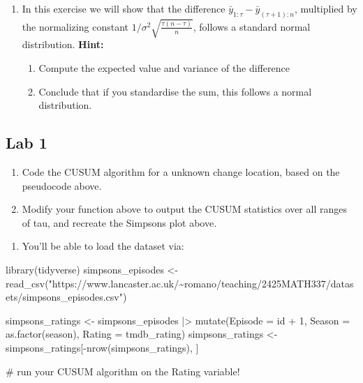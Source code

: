 \documentclass[
  letterpaper,
  DIV=11,
  numbers=noendperiod]{scrreprt}
\newenvironment{Shaded}{\begin{snugshade}}{\end{snugshade}}
\newcommand{\AttributeTok}[1]{\textcolor[rgb]{0.40,0.45,0.13}{#1}}
\newcommand{\CommentTok}[1]{\textcolor[rgb]{0.37,0.37,0.37}{#1}}
\newcommand{\DecValTok}[1]{\textcolor[rgb]{0.68,0.00,0.00}{#1}}
\newcommand{\FunctionTok}[1]{\textcolor[rgb]{0.28,0.35,0.67}{#1}}
\newcommand{\NormalTok}[1]{\textcolor[rgb]{0.00,0.23,0.31}{#1}}
\newcommand{\OtherTok}[1]{\textcolor[rgb]{0.00,0.23,0.31}{#1}}
\newcommand{\SpecialCharTok}[1]{\textcolor[rgb]{0.37,0.37,0.37}{#1}}
\newcommand{\StringTok}[1]{\textcolor[rgb]{0.13,0.47,0.30}{#1}}
\providecommand{\tightlist}{%
  \setlength{\itemsep}{0pt}\setlength{\parskip}{0pt}}\usepackage{longtable,booktabs,array}
\begin{document}
\begin{enumerate}
\def\labelenumi{\arabic{enumi}.}
\setcounter{enumi}{1}
\item
  In this exercise we will show that the difference
  \(\bar{y}_{1:\tau} - \bar{y}_{(\tau+1):n}\), multiplied by the
  normalizing constant \(1/\sigma^2\sqrt{\frac{\tau(n-\tau)}{n}}\),
  follows a standard normal distribution. \textbf{Hint:}

  \begin{enumerate}
  \def\labelenumii{\alph{enumii}.}
  \item
    Compute the expected value and variance of the difference
  \item
    Conclude that if you standardise the sum, this follows a normal
    distribution.
  \end{enumerate}
\end{enumerate}

\subsection{Lab 1}\label{lab-1}

\begin{enumerate}
\def\labelenumi{\arabic{enumi}.}
\item
  Code the CUSUM algorithm for a unknown change location, based on the
  pseudocode above.
\item
  Modify your function above to output the CUSUM statistics over all
  ranges of tau, and recreate the Simpsons plot above.
\end{enumerate}

\begin{enumerate}
\def\labelenumi{\alph{enumi}.}
\tightlist
\item
  You'll be able to load the dataset via:
\end{enumerate}

\begin{Shaded}
\begin{Highlighting}[]
\FunctionTok{library}\NormalTok{(tidyverse)}
\NormalTok{simpsons\_episodes }\OtherTok{\textless{}{-}} \FunctionTok{read\_csv}\NormalTok{(}\StringTok{"https://www.lancaster.ac.uk/\textasciitilde{}romano/teaching/2425MATH337/datasets/simpsons\_episodes.csv"}\NormalTok{)}

\NormalTok{simpsons\_ratings }\OtherTok{\textless{}{-}}\NormalTok{ simpsons\_episodes }\SpecialCharTok{|\textgreater{}} 
  \FunctionTok{mutate}\NormalTok{(}\AttributeTok{Episode =}\NormalTok{ id }\SpecialCharTok{+} \DecValTok{1}\NormalTok{, }\AttributeTok{Season =} \FunctionTok{as.factor}\NormalTok{(season), }\AttributeTok{Rating =}\NormalTok{ tmdb\_rating)}
\NormalTok{simpsons\_ratings }\OtherTok{\textless{}{-}}\NormalTok{ simpsons\_ratings[}\SpecialCharTok{{-}}\FunctionTok{nrow}\NormalTok{(simpsons\_ratings), ]}

\CommentTok{\# run your CUSUM algorithm on the Rating variable!}
\end{Highlighting}
\end{Shaded}
\end{document}
